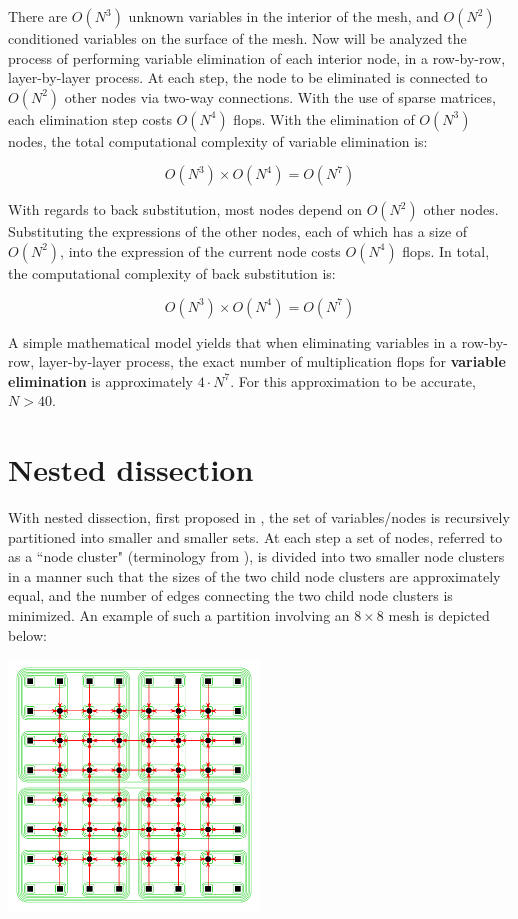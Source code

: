 \documentclass{article}
\begin{document}
There are \(O(N^3)\) unknown variables in the interior of the mesh, and \(O(N^2)\) conditioned variables on the surface of the mesh. Now will be analyzed the process of performing variable elimination of each interior node, in a row-by-row, layer-by-layer process. At each step, the node to be eliminated is connected to \(O(N^2)\) other nodes via two-way connections. With the use of sparse matrices, each elimination step costs \(O(N^4)\) flops. With the elimination of \(O(N^3)\) nodes, the total computational complexity of variable elimination is: 

\[O(N^3) \times O(N^4) = O(N^7)\] 

With regards to back substitution, most nodes depend on \(O(N^2)\) other nodes. Substituting the expressions of the other nodes, each of which has a size of \(O(N^2)\), into the expression of the current node costs \(O(N^4)\) flops. In total, the computational complexity of back substitution is: 

 \[O(N^3) \times O(N^4) = O(N^7)\]

A simple mathematical model yields that when eliminating variables in a row-by-row, layer-by-layer process, the exact number of multiplication flops for {\bf variable elimination} is approximately \(4 \cdot N^7\). For this approximation to be accurate, \(N > 40\).






\section{Nested dissection}

With nested dissection, first proposed in \cite{[George1973]}, the set of variables/nodes is recursively partitioned into smaller and smaller sets. At each step a set of nodes, referred to as a ``node cluster" (terminology from \cite{[Darve2009]}), is divided into two smaller node clusters in a manner such that the sizes of the two child node clusters are approximately equal, and the number of edges connecting the two child node clusters is minimized. An example of such a partition involving an \(8 \times 8\) mesh is depicted below:

\begin{center}
\includegraphics[width = 0.5\textwidth]{example_nested_dissection/example_nested_dissection_elimination_panel_1}
\end{center}
\end{document}
